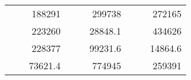 \begin{table}[]
\begin{tabular}{|ccrccrccc}
\rowcolor[HTML]{DAE8FC} 
\multicolumn{1}{|c|}{\cellcolor[HTML]{FFFFC7}}                                & \multicolumn{1}{c|}{\cellcolor[HTML]{DAE8FC}}                      & \multicolumn{1}{r|}{\cellcolor[HTML]{DAE8FC}188291}    & \multicolumn{1}{c|}{\cellcolor[HTML]{FFFFC7}}                                & \multicolumn{1}{c|}{\cellcolor[HTML]{DAE8FC}}                       & \multicolumn{1}{r|}{\cellcolor[HTML]{DAE8FC}299738}    & \multicolumn{1}{c|}{\cellcolor[HTML]{FFFFC7}}                                & \multicolumn{1}{c|}{\cellcolor[HTML]{DAE8FC}}                      & \multicolumn{1}{r|}{\cellcolor[HTML]{DAE8FC}272165}    \\ \cline{3-3} \cline{6-6} \cline{9-9} 
\multicolumn{1}{|c|}{\cellcolor[HTML]{FFFFC7}}                                & \multicolumn{1}{c|}{\cellcolor[HTML]{DAE8FC}}                      & \multicolumn{1}{r|}{\cellcolor[HTML]{DDFDFF}223260}    & \multicolumn{1}{c|}{\cellcolor[HTML]{FFFFC7}}                                & \multicolumn{1}{c|}{\cellcolor[HTML]{DAE8FC}}                       & \multicolumn{1}{r|}{\cellcolor[HTML]{DDFDFF}28848.1}   & \multicolumn{1}{c|}{\cellcolor[HTML]{FFFFC7}}                                & \multicolumn{1}{c|}{\cellcolor[HTML]{DAE8FC}}                      & \multicolumn{1}{r|}{\cellcolor[HTML]{DDFDFF}434626}    \\ \cline{3-3} \cline{6-6} \cline{9-9} 
\rowcolor[HTML]{DAE8FC} 
\multicolumn{1}{|c|}{\cellcolor[HTML]{FFFFC7}}                                & \multicolumn{1}{c|}{\cellcolor[HTML]{DAE8FC}}                      & \multicolumn{1}{r|}{\cellcolor[HTML]{DAE8FC}228377}    & \multicolumn{1}{c|}{\cellcolor[HTML]{FFFFC7}}                                & \multicolumn{1}{c|}{\cellcolor[HTML]{DAE8FC}}                       & \multicolumn{1}{r|}{\cellcolor[HTML]{DAE8FC}99231.6}   & \multicolumn{1}{c|}{\cellcolor[HTML]{FFFFC7}}                                & \multicolumn{1}{c|}{\cellcolor[HTML]{DAE8FC}}                      & \multicolumn{1}{r|}{\cellcolor[HTML]{DAE8FC}14864.6}   \\ \cline{3-3} \cline{6-6} \cline{9-9} 
\multicolumn{1}{|c|}{\cellcolor[HTML]{FFFFC7}}                                & \multicolumn{1}{c|}{\cellcolor[HTML]{DAE8FC}}                      & \multicolumn{1}{r|}{\cellcolor[HTML]{DDFDFF}73621.4}   & \multicolumn{1}{c|}{\cellcolor[HTML]{FFFFC7}}                                & \multicolumn{1}{c|}{\cellcolor[HTML]{DAE8FC}}                       & \multicolumn{1}{r|}{\cellcolor[HTML]{DDFDFF}774945}    & \multicolumn{1}{c|}{\cellcolor[HTML]{FFFFC7}}                                & \multicolumn{1}{c|}{\cellcolor[HTML]{DAE8FC}}                      & \multicolumn{1}{r|}{\cellcolor[HTML]{DDFDFF}259391}    \\ \cline{3-3} \cline{6-6} \cline{9-9} 

\end{tabular}
\end{table}
